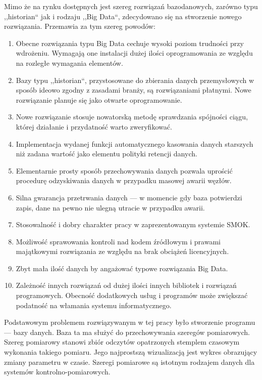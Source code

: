 \documentclass[a4paper,polish,12pt,twoside]{article}
\begin{document}
Mimo że na rynku dostępnych jest szereg rozwiązań bazodanowych, zarówno typu ,,historian`` jak i rodzaju ,,Big Data``, zdecydowano się na stworzenie nowego rozwiązania. Przemawia za tym szereg powodów:
	\begin{enumerate}
		\item Obecne rozwiązania typu Big Data cechuje wysoki poziom trudności przy wdrożeniu. Wymagają one instalacji dużej ilości oprogramowania ze względu na rozległe wymagania elementów.
		\item Bazy typu ,,historian``, przystosowane do zbierania danych przemysłowych w sposób ideowo zgodny z zasadami branży, są rozwiązaniami płatnymi. Nowe rozwiązanie planuje się jako otwarte oprogramowanie.
		\item Nowe rozwiązanie stosuje nowatorską metodę sprawdzania spójności ciągu, której działanie i przydatność warto zweryfikować. 
		\item Implementacja wydanej funkcji automatycznego kasowania danych starszych niż zadana wartość jako elementu polityki retencji danych.
		\item Elementarnie prosty sposób przechowywania danych pozwala uprościć procedurę odzyskiwania danych w przypadku masowej awarii węzłów.
		\item Silna gwarancja przetrwania danych --- w momencie gdy baza potwierdzi zapis, dane na pewno nie ulegną utracie w przypadku awarii.
		\item Stosowalność i dobry charakter pracy w zaprezentowanym systemie SMOK.
		\item Możliwość sprawowania kontroli nad kodem źródłowym i prawami majątkowymi rozwiązania ze względu na brak obciążeń licencyjnych.
		\item Zbyt mała ilość danych by angażować typowe rozwiązania Big Data.
		\item Zależność innych rozwiązań od dużej ilości innych bibliotek i rozwiązań programowych. Obecność dodatkowych usług i programów może zwiększać podatność na włamania systemu informatycznego.
	\end{enumerate}

Podstawowym problemem rozwiązywanym w tej pracy było stworzenie programu --- bazy danych. Baza ta ma służyć do przechowywania szeregów pomiarowych. Szereg pomiarowy stanowi zbiór odczytów opatrzonych stemplem czasowym wykonania takiego pomiaru. Jego najprostszą wizualizacją jest wykres obrazujący zmiany parametru w czasie. Szeregi pomiarowe są istotnym rodzajem danych dla systemów kontrolno-pomiarowych.
\end{document}
